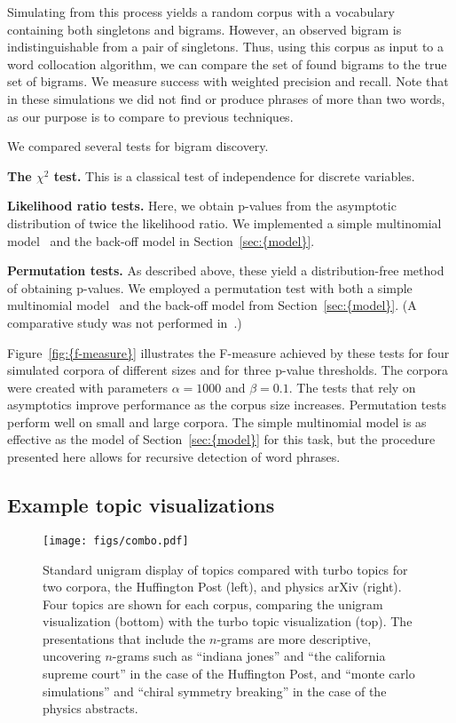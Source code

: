 \documentclass[11pt]{article}
\begin{document}
Simulating from this process yields a random corpus with a vocabulary
containing both singletons and bigrams.  However, an observed bigram
is indistinguishable from a pair of singletons.  Thus, using this corpus
as input to a word collocation algorithm, we can compare the set of
found bigrams to the true set of bigrams.  We measure success with
weighted precision and recall.  Note that in these simulations we did
not find or produce phrases of more than two words, as our purpose is
to compare to previous techniques.

We compared several tests for bigram discovery.

\textbf{The $\chi^2$ test.}  This is a classical test of
independence for discrete variables.

\textbf{Likelihood ratio tests.}  Here, we obtain p-values from
the asymptotic distribution of twice the likelihood ratio.  We
implemented a simple multinomial model~\citep{Dunning:1993} and the
back-off model in {Section~\ref{sec:{model}}}.

\textbf{Permutation tests.}  As described above, these yield a
distribution-free method of obtaining p-values.  We employed a
permutation test with both a simple multinomial
model~\citep{Pedersen:1996} and the back-off model from {Section~\ref{sec:{model}}}.
(A comparative study was not performed in~\cite{Pedersen:1996}.)

{Figure~\ref{fig:{f-measure}}} illustrates the F-measure achieved by these tests
for four simulated corpora of different sizes and for three p-value
thresholds.  The corpora were created with parameters $\alpha=1000$
and $\beta=0.1$.  The tests that rely on asymptotics improve
performance as the corpus size increases.  Permutation tests perform
well on small and large corpora.  The simple multinomial model is as
effective as the model of {Section~\ref{sec:{model}}} for this task, but the
procedure presented here allows for recursive detection of word
phrases.

\subsection{Example topic visualizations}
\label{sec:topics}

\begin{figure*}[t]
\begin{center}
\texttt{[image: figs/combo.pdf]}
\caption{\label{fig:huff} Standard unigram display of topics compared
  with turbo topics for two corpora, the Huffington Post (left), and
  physics arXiv (right).  Four topics are shown for each corpus,
  comparing the unigram visualization (bottom) with the turbo topic
  visualization (top).  The presentations that include the $n$-grams
  are more descriptive, uncovering $n$-grams such as ``indiana jones''
  and ``the california supreme court'' in the case of the Huffington
  Post, and ``monte carlo simulations'' and ``chiral symmetry
  breaking'' in the case of the physics abstracts.}
\end{center}
\end{figure*}
\end{document}
